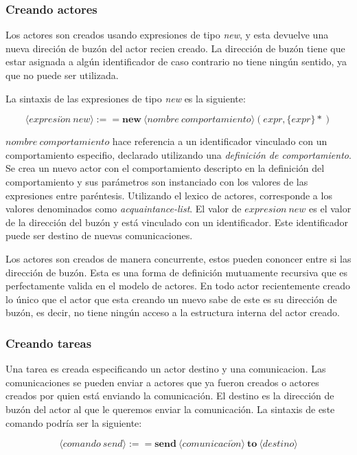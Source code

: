 \subsubsection*{Creando actores}

Los actores son creados usando expresiones de tipo \textit{new}, y esta devuelve una nueva direción de buzón del actor recien creado. La dirección de buzón tiene que estar asignada a algún identificador de caso contrario no tiene ningún sentido, ya que no puede ser utilizada.

La sintaxis de las expresiones de tipo \textit{new} es la siguiente:

\[
   \langle expresi\acute{o}n\ new \rangle :== \textbf{new}\ \langle nombre\ comportamiento \rangle (expr, \{expr\}*)  
\]

$nombre\ comportamiento$ hace referencia a un identificador vinculado con un comportamiento especifio, declarado utilizando una \textit{definición de comportamiento}. Se crea un nuevo actor con el comportamiento descripto en la definición del comportamiento y sus parámetros son instanciado con los valores de las expresiones entre paréntesis. Utilizando el lexico de actores, corresponde a los valores denominados como \textit{acquaintance-list}. El valor de $expresion\ new$ es el valor de la dirección del buzón y está vinculado con un identificador. Este identificador puede ser destino de nuevas comunicaciones. 

Los actores son creados de manera concurrente, estos pueden cononcer entre si las dirección de buzón. Esta es una forma de definición mutuamente recursiva que es perfectamente valida en el modelo de actores. En todo actor recientemente creado lo único que el actor que esta creando un nuevo sabe de este es su dirección de buzón, es decir, no tiene ningún acceso a la estructura interna del actor creado.

\subsubsection*{Creando tareas}

Una tarea es creada especificando un actor destino y una comunicacion. Las comunicaciones se pueden enviar a actores que ya fueron creados o actores creados por quien está enviando la comunicación. El destino es la dirección de buzón del actor al que le queremos enviar la comunicación. La sintaxis de este comando podría ser la siguiente:

\[
  \langle comando\ send \rangle :== \textbf{send}\ \langle comunicaci\acute{o}n \rangle\ \textbf{to}\ \langle destino \rangle
\]

